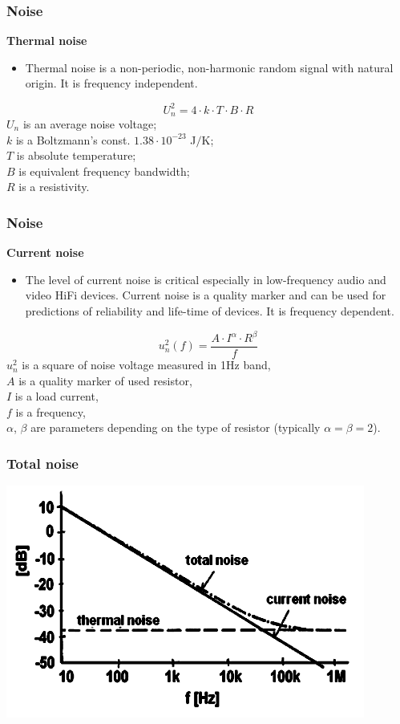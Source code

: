 \documentclass{beamer}
\begin{document}
	\begin{frame}
    \frametitle{Noise}
		\textbf{Thermal noise}
		\begin{itemize}
			\item Thermal noise is a non-periodic, non-harmonic random signal with natural origin. It is frequency independent. 
		\end{itemize}
		$$U_n^2= 4\cdot k\cdot T\cdot B\cdot R$$
		\small{$U_n$ is an average noise voltage; \\ $k$ is a Boltzmann's const. $1.38\cdot 10^{-23}$ J$/$K; \\ $T$ is absolute temperature; \\ $B$ is equivalent frequency bandwidth; \\ $R$ is a resistivity. }

  \end{frame}
	\begin{frame}
    \frametitle{Noise}
		\textbf{Current noise}
		\begin{itemize}
			\item The level of current noise is critical especially in low-frequency audio and video HiFi devices. Current noise is a quality marker and can be used for predictions of reliability and life-time of devices. It is frequency dependent.
		\end{itemize}
		$$u_n^2(f)= \frac{A\cdot I^\alpha\cdot R^\beta}{f}$$
		\small{$u_n^2$ is a square of noise voltage measured in 1Hz band,\\ $A$ is a quality marker of used resistor,\\ $I$ is a load current,\\ $f$ is a frequency,\\ $\alpha$, $\beta$ are parameters depending on the type of resistor (typically $\alpha = \beta = 2$).}

  \end{frame}
	\begin{frame}
    \frametitle{Total noise}
		\begin{center}
		\includegraphics[scale=0.7]{obr10_sum.png}\\
		\end{center}
  \end{frame}
\end{document}
